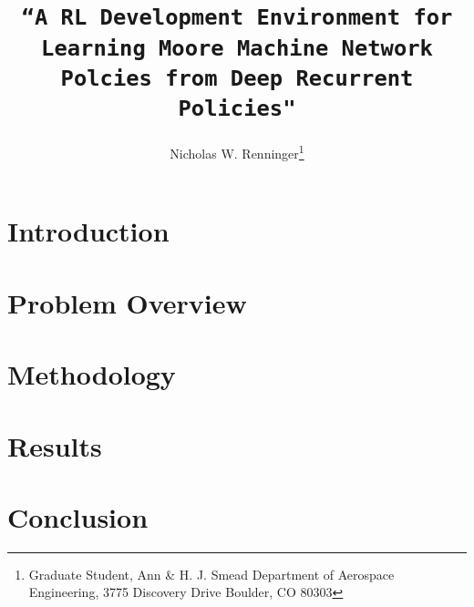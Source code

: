 

\title{\texttt{``A RL Development Environment for Learning Moore Machine Network Polcies from Deep Recurrent Policies"}}

\author{
Nicholas W. Renninger\footnote{Graduate Student, Ann \& H. J. Smead Department of Aerospace Engineering, 3775 Discovery Drive
Boulder, CO 80303}}



\maketitle

\section{Introduction}


\section{Problem Overview}


\FloatBarrier
\section{Methodology}


\newpage
\FloatBarrier
\section{Results}


\FloatBarrier
\section{Conclusion}




% 


